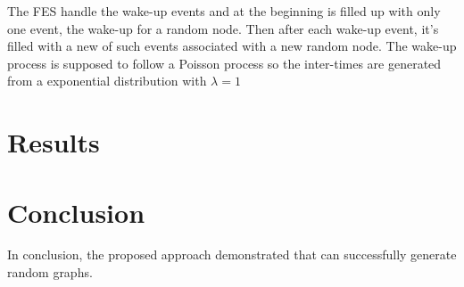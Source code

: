 \documentclass[conference]{IEEEtran}
\begin{document}
    The FES handle the wake-up events and at the beginning is filled up with only one event, the wake-up for a random node. 
    Then after each wake-up event, it's filled with a new of such events associated with a new random node.
    The wake-up process is supposed to follow a Poisson process so the inter-times are generated from a exponential distribution with $\lambda=1$

\section{Results}



    
\section{Conclusion}

In conclusion, the proposed approach demonstrated that can successfully generate random graphs.

%
%
\end{document}
